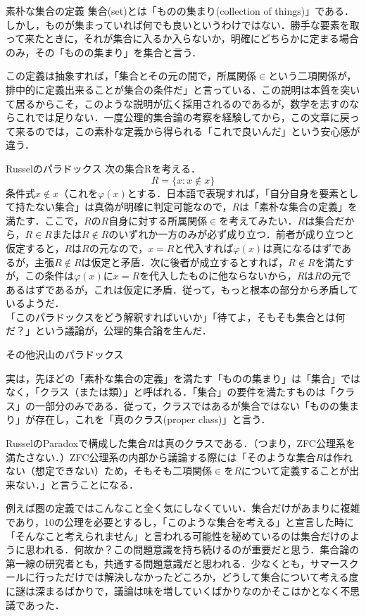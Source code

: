 \documentclass[uplatex, 12pt, a4paper, dvipdfmx]{jsreport}
\begin{document}
\begin{itembox}[l]{素朴な集合の定義}
	集合(set)とは「ものの集まり(collection of things)」である．しかし，ものが集まっていれば何でも良いというわけではない．勝手な要素を取って来たときに，それが集合に入るか入らないか，明確にどちらかに定まる場合のみ，その「ものの集まり」を集合と言う．
\end{itembox}

この定義は抽象すれば，「集合とその元の間で，所属関係$\in$という二項関係が，排中的に定義出来ることが集合の条件だ」と言っている．この説明は本質を突いて居るからこそ，このような説明が広く採用されるのであるが，数学を志すのならこれでは足りない．一度公理的集合論の考察を経験してから，この文章に戻って来るのでは，この素朴な定義から得られる「これで良いんだ」という安心感が違う．

\begin{itembox}[l]{Russelのパラドックス}
	次の集合Rを考える．$$R=\{ x:x\notin x \}$$
	条件式$x\notin x$（これを$\varphi (x)$とする．日本語で表現すれば，「自分自身を要素として持たない集合」は真偽が明確に判定可能なので，$R$は「素朴な集合の定義」を満たす．ここで，$R$の$R$自身に対する所属関係$\in$を考えてみたい．$R$は集合だから，$R\in R$または$R\notin R$のいずれか一方のみが必ず成り立つ．前者が成り立つと仮定すると，$R$は$R$の元なので，$x=R$と代入すれば$\varphi (x)$は真になるはずであるが，主張$R\notin R$は仮定と矛盾．次に後者が成立するとすれば，$R\notin R$を満たすが，この条件は$\varphi (x)$に$x=R$を代入したものに他ならないから，$R$は$R$の元であるはずであるが，これは仮定に矛盾．従って，もっと根本の部分から矛盾しているようだ．\\
「このパラドックスをどう解釈すればいいか」「待てよ，そもそも集合とは何だ？」という議論が，公理的集合論を生んだ．
\end{itembox}


その他沢山のパラドックス

実は，先ほどの「素朴な集合の定義」を満たす「ものの集まり」は「集合」ではなく，「クラス（または類）」と呼ばれる．「集合」の要件を満たすものは「クラス」の一部分のみである．従って，クラスではあるが集合ではない「ものの集まり」が存在し，これを「真のクラス(proper class)」と言う．

RusselのParadoxで構成した集合$R$は真のクラスである．（つまり，ZFC公理系を満たさない．）ZFC公理系の内部から議論する際には「そのような集合$R$は作れない（想定できない）ため，そもそも二項関係$\in$を$R$について定義することが出来ない．」と言うことになる．

例えば圏の定義ではこんなこと全く気にしなくていい．集合だけがあまりに複雑であり，10の公理を必要とするし，「このような集合を考える」と宣言した時に「そんなこと考えられません」と言われる可能性を秘めているのは集合だけのように思われる．何故か？この問題意識を持ち続けるのが重要だと思う．集合論の第一線の研究者とも，共通する問題意識だと思われる．少なくとも，サマースクールに行っただけでは解決しなかったどころか，どうして集合について考える度に謎は深まるばかりで，議論は味を増していくばかりなのかそこはかとなく不思議であった．
\end{document}
